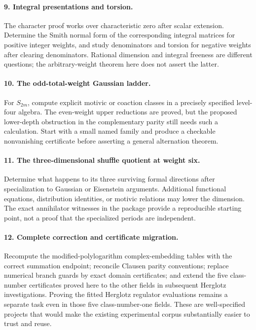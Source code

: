 \documentclass[11pt,a4paper]{article}
\theoremstyle{definition}
\theoremstyle{remark}
\numberwithin{equation}{section}
\begin{document}
\paragraph{9. Integral presentations and torsion.}
The character proof works over characteristic zero after scalar
extension.  Determine the Smith normal form of the corresponding
integral matrices for positive integer weights, and study denominators
and torsion for negative weights after clearing denominators.
Rational dimension and integral freeness are different questions;
the arbitrary-weight theorem here does not assert the latter.

\paragraph{10. The odd-total-weight Gaussian ladder.}
For $S_{2m}$, compute explicit motivic or coaction classes in a precisely
specified level-four algebra.  The even-weight upper reductions are
proved, but the proposed lower-depth obstruction in the complementary
parity still needs such a calculation.  Start with a small named family
and produce a checkable nonvanishing certificate before asserting a
general alternation theorem.

\paragraph{11. The three-dimensional shuffle quotient at weight six.}
Determine what happens to its three surviving formal directions after
specialization to Gaussian or Eisenstein arguments.  Additional
functional equations, distribution identities, or motivic relations
may lower the dimension.  The exact annihilator witnesses in the
package provide a reproducible starting point, not a proof that the
specialized periods are independent.

\paragraph{12. Complete correction and certificate migration.}
Recompute the modified-polylogarithm complex-embedding tables with the
correct summation endpoint; reconcile Clausen parity conventions;
replace numerical branch guards by exact domain certificates; and
extend the five class-number certificates proved here to the other
fields in subsequent Herglotz investigations. Proving the fitted
Herglotz regulator evaluations remains a separate task even in those
five class-number-one fields. These are well-specified projects
that would make the existing experimental corpus substantially easier
to trust and reuse.
\end{document}
